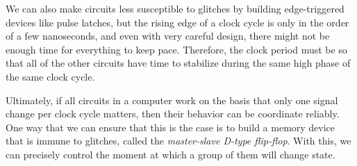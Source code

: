   We can also make circuits less susceptible to glitches by building edge-triggered devices like pulse latches, but the rising edge of a clock cycle is only in the order of a few nanoseconds, and even with very careful design, there might not be enough time for everything to keep pace. Therefore, the clock period must be so that all of the other circuits have time to stabilize during the same high phase of the same clock cycle. 

  Ultimately, if all circuits in a computer work on the basis that only one signal change per clock cycle matters, then their behavior can be coordinate reliably. One way that we can ensure that this is the case is to build a memory device that is immune to glitches, called the \textit{master-slave D-type flip-flop}. With this, we can precisely control the moment at which a group of them will change state. 

